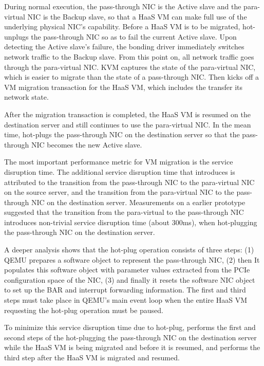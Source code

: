 During normal execution, the pass-through NIC is the Active slave and the para-virtual NIC is the Backup slave,
so that a HaaS VM can make full use of the underlying physical NIC's capability.
Before a HaaS VM is to be migrated, \na hot-unplugs the pass-through NIC so as to fail the current Active slave.
Upon detecting the Active slave's failure, the bonding driver immediately switches network traffic to the Backup slave.
From this point on, all network traffic goes through the para-virtual NIC.
KVM captures the state of the para-virtual NIC, which is easier to migrate than the state of a pass-through NIC.
Then \na kicks off a VM migration transaction for the HaaS VM, which includes the transfer its network state.

After the migration transaction is completed, the HaaS VM is resumed on the destination server and still continues to use the para-virtual NIC.
In the mean time, \na hot-plugs the pass-through NIC on the destination  server
so that the pass-through NIC becomes the new Active slave.



The most important performance metric for VM migration is the service disruption time.
The additional service disruption time that \na introduces is attributed to the transition from
the pass-through NIC to the para-virtual NIC on the source server, and the transition from
the para-virtual NIC to the pass-through NIC on the destination server.
Measurements on a earlier \na prototype suggested that the transition from the
para-virtual to the pass-through NIC introduces non-trivial service disruption time (about 300ms),
when hot-plugging the pass-through NIC on the destination server.

A deeper analysis shows that the hot-plug operation consists of three steps:
(1) QEMU prepares a software object to represent the pass-through
NIC, (2) then It populates this software object with parameter values extracted
from the PCIe configuration space of the NIC, (3) and finally it
resets the software NIC object to set up the BAR and interrupt forwarding
information. The first and third steps must take place in QEMU's main event
loop when the entire HaaS VM requesting the hot-plug operation must be paused.

To minimize this service disruption time due to hot-plug,
\na performs the first and second steps of the hot-plugging the pass-through NIC
on the destination server while the HaaS VM is being migrated and before it is resumed,
and performs the third step after the HaaS VM is migrated and resumed.


